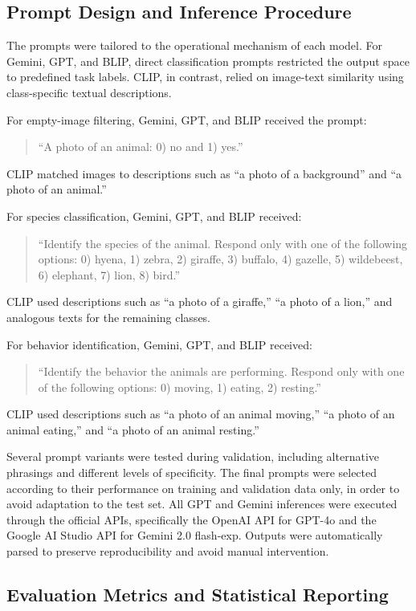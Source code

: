 \subsection{Prompt Design and Inference Procedure}

The prompts were tailored to the operational mechanism of each model. For Gemini, GPT, and BLIP, direct classification prompts restricted the output space to predefined task labels. CLIP, in contrast, relied on image-text similarity using class-specific textual descriptions.

For empty-image filtering, Gemini, GPT, and BLIP received the prompt:
\begin{quote}
``A photo of an animal: 0) no and 1) yes.''
\end{quote}
CLIP matched images to descriptions such as ``a photo of a background'' and ``a photo of an animal.''

For species classification, Gemini, GPT, and BLIP received:
\begin{quote}
``Identify the species of the animal. Respond only with one of the following options: 0) hyena, 1) zebra, 2) giraffe, 3) buffalo, 4) gazelle, 5) wildebeest, 6) elephant, 7) lion, 8) bird.''
\end{quote}
CLIP used descriptions such as ``a photo of a giraffe,'' ``a photo of a lion,'' and analogous texts for the remaining classes.

For behavior identification, Gemini, GPT, and BLIP received:
\begin{quote}
``Identify the behavior the animals are performing. Respond only with one of the following options: 0) moving, 1) eating, 2) resting.''
\end{quote}
CLIP used descriptions such as ``a photo of an animal moving,'' ``a photo of an animal eating,'' and ``a photo of an animal resting.''

Several prompt variants were tested during validation, including alternative phrasings and different levels of specificity. The final prompts were selected according to their performance on training and validation data only, in order to avoid adaptation to the test set. All GPT and Gemini inferences were executed through the official APIs, specifically the OpenAI API for GPT-4o and the Google AI Studio API for Gemini 2.0 flash-exp. Outputs were automatically parsed to preserve reproducibility and avoid manual intervention.

\subsection{Evaluation Metrics and Statistical Reporting}

